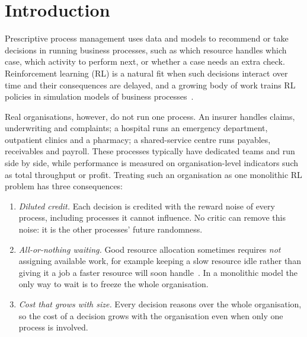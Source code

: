 \section{Introduction}\label{sec:intro}

Prescriptive process management uses data and models to recommend or take decisions
in running business processes, such as which resource handles which case, which
activity to perform next, or whether a case needs an extra check. Reinforcement
learning (RL) is a natural fit when such decisions interact over time and their
consequences are delayed, and a growing body of work trains RL policies in simulation
models of business processes~\cite{aepn2023,gympn2025}. 

Real organisations, however, do not run one process. An insurer handles claims,
underwriting and complaints; a hospital runs an emergency department, outpatient
clinics and a pharmacy; a shared-service centre runs payables, receivables and payroll.
These processes typically have dedicated teams and run side by side, while
performance is measured on organisation-level indicators such as total throughput or
profit. Treating such an organisation as one monolithic RL problem has three
consequences:
\begin{enumerate}
  \item \emph{Diluted credit.} Each decision is credited with the reward noise of
    every process, including processes it cannot influence. No critic can remove this
    noise: it is the other processes' future randomness.
  \item \emph{All-or-nothing waiting.} Good resource allocation sometimes requires
    \emph{not} assigning available work, for example keeping a slow resource idle
    rather than giving it a job a faster resource will soon handle~\cite{linkumar1984}.
    In a monolithic model the only way to wait is to freeze the whole organisation.
  \item \emph{Cost that grows with size.} Every decision reasons over the whole
    organisation, so the cost of a decision grows with the organisation even when
    only one process is involved.
\end{enumerate}

